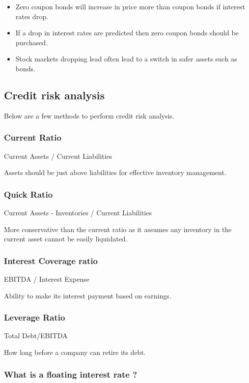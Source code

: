 \documentclass[11pt]{scrartcl} %
\begin{document}
\begin{itemize}
	\item Zero coupon bonds will increase in price more than coupon bonds if interest rates drop.
	\item If a drop in interest rates are predicted then zero coupon bonds should be purchased.
	\item Stock markets dropping lead often lead to a switch in safer assets such as bonds.
\end{itemize}

\subsection{Credit risk analysis}

Below are a few methods to perform credit risk analysis.

\subsubsection{Current Ratio}

Current Assets / Current Liabilities

Assets should be just above liabilities for effective inventory management.

\subsubsection{Quick Ratio}

Current Assets - Inventories / Current Liabilities

More conservative than the current ratio as it assumes any inventory in the current asset cannot be easily liquidated.

\subsubsection{Interest Coverage ratio}

EBITDA / Interest Expense

Ability to make its interest payment based on earnings.

\subsubsection{Leverage Ratio}

Total Debt/EBITDA

How long before a company can retire its debt.

\subsubsection{What is a floating interest rate ?}
\end{document}
